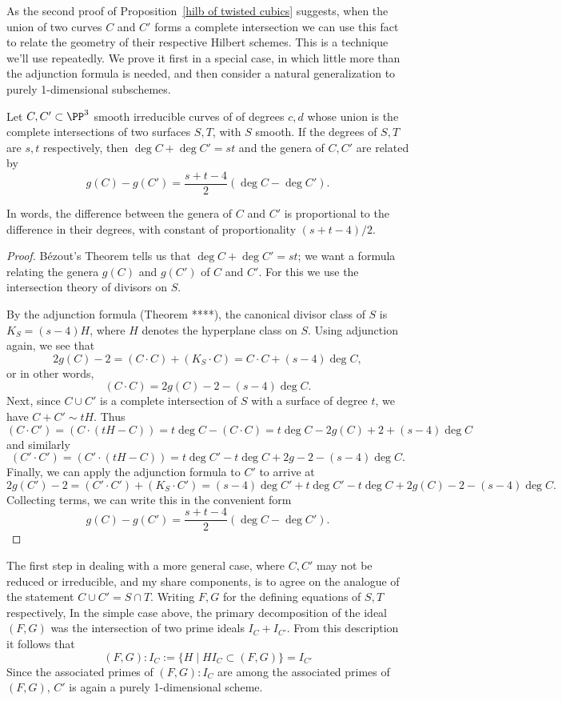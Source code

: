 As the second proof of Proposition~\ref{hilb of twisted cubics} suggests, when the union of two curves $C$ and $C'$ forms a complete intersection we can use this fact to relate the geometry of their respective Hilbert schemes. This is a technique we'll use repeatedly. We prove it first in a special case, in which little more
than the adjunction formula is needed, and then consider a natural
generalization to purely 1-dimensional subschemes.

\begin{theorem}\label{liaison genus formula-first version} Let $C, {C'}\subset \PP^3$ smooth irreducible curves of  of degrees $c,d$ whose union is the complete intersections of two surfaces $S,T$, with $S$ smooth. If the degrees of $S,T$ are $s,t$ respectively, then $\deg C+\deg C' = st$ and the genera of $C,C'$ are
related by
 $$
 g(C) - g({C'}) = \frac{s+t-4}{2}(\deg C-\deg {C'}).
 $$
\end{theorem}
In words, the difference between the genera of $C$ and ${C'}$ is proportional to the difference in their degrees, with constant of proportionality $(s+t-4)/2$.

\begin{proof}
B\'ezout's Theorem tells us that $\deg C+\deg {C'} = st$; we want a formula relating the genera $g(C)$ and $g({C'})$ of $C$ and ${C'}$. For this we use
 the intersection theory of divisors on $S$.

By the adjunction formula (Theorem ****), the canonical divisor class of $S$ is $K_S = (s - 4)H$, where $H$ denotes the hyperplane class on $S$. Using adjunction 
again, we see that
$$
2g(C)-2 = (C\cdot C) + (K_S\cdot C) = C\cdot C + (s-4)\deg C, 
$$
or in other words,
$$
(C \cdot C) = 2g(C)-2 - (s-4)\deg C.
$$
Next, since $C \cup {C'}$ is a complete intersection of $S$ with a surface of degree $t$, we have $C + {C'}\sim tH$. Thus 
$$
(C \cdot {C'}) = (C \cdot (tH - C)) = t\deg C - (C \cdot C) = t\deg C - 2g(C) + 2 + (s-4)\deg C
$$
and similarly
$$
({C'} \cdot {C'}) = ({C'} \cdot (tH - C)) = t\deg {C'} - t\deg C + 2g - 2 - (s-4)\deg C. 
$$
Finally, we can apply the adjunction formula to ${C'}$ to arrive at
$$
2g(C') - 2 = ({C'} \cdot {C'}) + (K_S \cdot {C'}) = (s-4)\deg {C'}  + t\deg {C'} - t\deg C + 2g(C) - 2 - (s-4)\deg C.
$$
Collecting terms, we can write this in the convenient form
$$
g(C)-g(C') = \frac{s+t-4}{2}(\deg {C}-\deg C').
$$
 \end{proof}

The first step in dealing with a more general case, where $C,{C'}$ may not be reduced or irreducible, and my share components, is to agree
on the analogue of the statement $C\cup {C'} = S\cap T$. Writing $F,G$ for the defining equations of $S,T$ respectively,
In the simple case above, the primary decomposition of the ideal $(F,G)$ was the intersection of two prime ideals $I_C+I_{C'}$. From this description it
follows that
$$
(F,G):I_C := \{H \mid HI_C \subset (F,G)\} = I_{C'}
$$
Since the associated primes of $(F,G):I_C$ are among the associated primes of $(F,G)$, 
${C'}$ is again a purely 1-dimensional scheme. 

